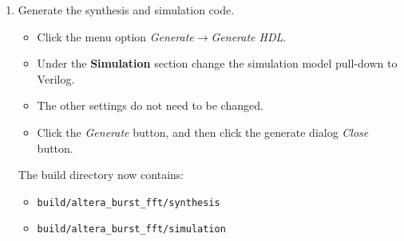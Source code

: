 \begin{enumerate}
\begin{itemize}
\begin{itemize}
\item Representation: Block Floating Point
\item Data Input Width: 16 bits
\item Twiddle Width: 16 bits
\item Data Output Width: 16 bits
\end{itemize}
%
\item Click the menu option \emph{File}$\rightarrow$\emph{Save}, and then
click the save dialog \emph{Close} button.
\end{itemize}
%
The build directory then contains the Qsys file
\texttt{build/altera\_burst\_fft.qsys},
along with the directory \texttt{build/altera\_burst\_fft} that contains
files, but no subdirectories.
%
%
\begin{figure}[p]
  \begin{center}
    \includegraphics[width=\textwidth]
    {figures/altera_burst_fft_ip_parameter_editor.png}
  \end{center}
  \caption{Altera Burst FFT IP Parameter Editor view.}
  \label{fig:altera_burst_fft_ip_parameter_editor}
\end{figure}
%
Figure~\ref{fig:altera_burst_fft_ip_parameter_editor} shows the IP Parameter
Editor view.

%
\newpage
\item Generate the synthesis and simulation code.
%
\begin{itemize}
\item Click the menu option \emph{Generate}$\rightarrow$\emph{Generate HDL}.
\item Under the \textbf{Simulation} section change the simulation model
pull-down to Verilog.
\item The other settings do not need to be changed.
\item Click the \emph{Generate} button, and then click the
generate dialog \emph{Close} button.
\end{itemize}
%
The build directory now contains:
\begin{itemize}
\item \texttt{build/altera\_burst\_fft/synthesis}
\item \texttt{build/altera\_burst\_fft/simulation}
\end{itemize}


\end{enumerate}
